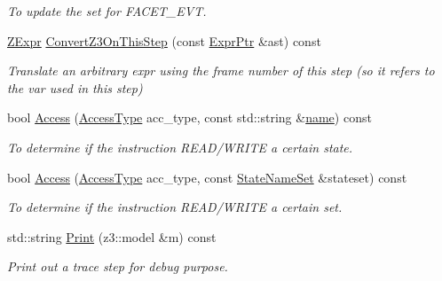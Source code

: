 \begin{DoxyCompactItemize}
\begin{DoxyCompactList}\small\item\em To update the set for F\+A\+C\+E\+T\+\_\+\+E\+VT. \end{DoxyCompactList}\item 
\mbox{\label{classilang_1_1_trace_step_ae3b361bcc0f0d01c27d5ed617032bf9a}} 
\mbox{\hyperlink{classilang_1_1_trace_step_a30c567f4df5a8481f8432b8c178a1794}{Z\+Expr}} \mbox{\hyperlink{classilang_1_1_trace_step_ae3b361bcc0f0d01c27d5ed617032bf9a}{Convert\+Z3\+On\+This\+Step}} (const \mbox{\hyperlink{namespaceilang_a7c4196c72e53ea4df4b7861af7bc3bce}{Expr\+Ptr}} \&ast) const
\begin{DoxyCompactList}\small\item\em Translate an arbitrary expr using the frame number of this step (so it refers to the var used in this step) \end{DoxyCompactList}\item 
\mbox{\label{classilang_1_1_trace_step_aea903528a1e31416a70986d6a189b9d5}} 
bool \mbox{\hyperlink{classilang_1_1_trace_step_aea903528a1e31416a70986d6a189b9d5}{Access}} (\mbox{\hyperlink{namespaceilang_ab4dc990a0af528177f6f90b63bd208c7}{Access\+Type}} acc\+\_\+type, const std\+::string \&\mbox{\hyperlink{classilang_1_1_trace_step_a38df7c1cd47ec7dc399b8ecb8dbaf2a7}{name}}) const
\begin{DoxyCompactList}\small\item\em To determine if the instruction R\+E\+A\+D/\+W\+R\+I\+TE a certain state. \end{DoxyCompactList}\item 
\mbox{\label{classilang_1_1_trace_step_a4548ca4185a17c6d06f4c0f61b26247e}} 
bool \mbox{\hyperlink{classilang_1_1_trace_step_a4548ca4185a17c6d06f4c0f61b26247e}{Access}} (\mbox{\hyperlink{namespaceilang_ab4dc990a0af528177f6f90b63bd208c7}{Access\+Type}} acc\+\_\+type, const \mbox{\hyperlink{classilang_1_1_trace_step_a784c4a30b16707ec6a2ed6e96e268c86}{State\+Name\+Set}} \&stateset) const
\begin{DoxyCompactList}\small\item\em To determine if the instruction R\+E\+A\+D/\+W\+R\+I\+TE a certain set. \end{DoxyCompactList}\item 
\mbox{\label{classilang_1_1_trace_step_ac2c95af4fe9144b4bc7dc430574ed993}} 
std\+::string \mbox{\hyperlink{classilang_1_1_trace_step_ac2c95af4fe9144b4bc7dc430574ed993}{Print}} (z3\+::model \&m) const
\begin{DoxyCompactList}\small\item\em Print out a trace step for debug purpose. \end{DoxyCompactList}\end{DoxyCompactItemize}
